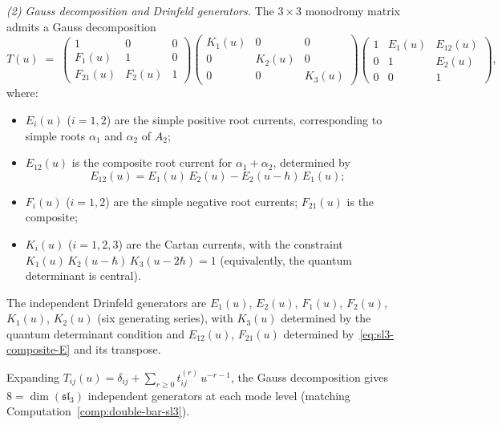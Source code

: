 \begin{example}
\medskip
\noindent\emph{(2) Gauss decomposition and Drinfeld generators.}
The $3\times 3$ monodromy matrix admits a Gauss decomposition
\begin{equation}\label{eq:sl3-gauss}
T(u)
\;=\;
\begin{pmatrix}
1 & 0 & 0 \\
F_1(u) & 1 & 0 \\
F_{21}(u) & F_2(u) & 1
\end{pmatrix}
\begin{pmatrix}
K_1(u) & 0 & 0 \\
0 & K_2(u) & 0 \\
0 & 0 & K_3(u)
\end{pmatrix}
\begin{pmatrix}
1 & E_1(u) & E_{12}(u) \\
0 & 1 & E_2(u) \\
0 & 0 & 1
\end{pmatrix},
\end{equation}
where:
\begin{itemize}[nosep]
\item $E_i(u)$ ($i=1,2$) are the simple positive root
 currents, corresponding to simple roots $\alpha_1$ and
 $\alpha_2$ of $A_2$;
\item $E_{12}(u)$ is the composite root current for
 $\alpha_1+\alpha_2$, determined by
 \begin{equation}\label{eq:sl3-composite-E}
 E_{12}(u) = E_1(u)\,E_2(u) - E_2(u{-}\hbar)\,E_1(u);
 \end{equation}
\item $F_i(u)$ ($i=1,2$) are the simple negative root
 currents; $F_{21}(u)$ is the composite;
\item $K_i(u)$ ($i=1,2,3$) are the Cartan currents, with
 the constraint $K_1(u)\,K_2(u-\hbar)\,K_3(u-2\hbar) = 1$ (equivalently,
 the quantum determinant is central).
\end{itemize}
The independent Drinfeld generators are
$E_1(u)$, $E_2(u)$, $F_1(u)$, $F_2(u)$, $K_1(u)$,
$K_2(u)$ (six generating series), with $K_3(u)$
determined by the quantum determinant condition and
$E_{12}(u)$, $F_{21}(u)$ determined
by~\eqref{eq:sl3-composite-E} and its transpose.

Expanding $T_{ij}(u) = \delta_{ij} + \sum_{r\ge 0}
t_{ij}^{(r)}\,u^{-r-1}$, the Gauss decomposition
gives $8 = \dim(\mathfrak{sl}_3)$ independent generators
at each mode level (matching
Computation~\ref{comp:double-bar-sl3}).


\end{example}
